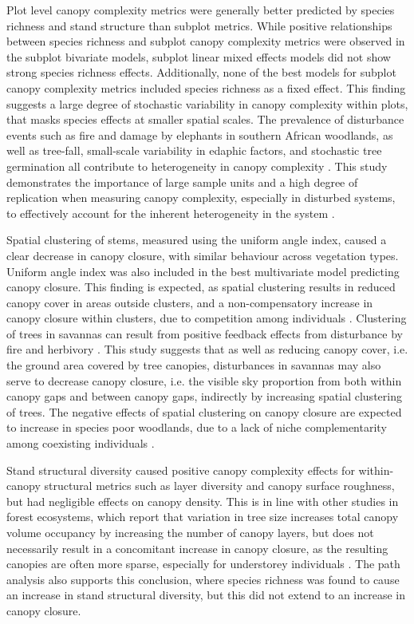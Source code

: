 \documentclass[11pt,a4paper]{article}
\begin{document}
Plot level canopy complexity metrics were generally better predicted by species richness and stand structure than subplot metrics. While positive relationships between species richness and subplot canopy complexity metrics were observed in the subplot bivariate models, subplot linear mixed effects models did not show strong species richness effects. Additionally, none of the best models for subplot canopy complexity metrics included species richness as a fixed effect. This finding suggests a large degree of stochastic variability in canopy complexity within plots, that masks species effects at smaller spatial scales. The prevalence of disturbance events such as fire and damage by elephants in southern African woodlands, as well as tree-fall, small-scale variability in edaphic factors, and stochastic tree germination all contribute to heterogeneity in canopy complexity \citep{}. This study demonstrates the importance of large sample units and a high degree of replication when measuring canopy complexity, especially in disturbed systems, to effectively account for the inherent heterogeneity in the system \citep{}.
 
Spatial clustering of stems, measured using the uniform angle index, caused a clear decrease in canopy closure, with similar behaviour across vegetation types. Uniform angle index was also included in the best multivariate model predicting canopy closure. This finding is expected, as spatial clustering results in reduced canopy cover in areas outside clusters, and a non-compensatory increase in canopy closure within clusters, due to competition among individuals \citep{}. Clustering of trees in savannas can result from positive feedback effects from disturbance by fire and herbivory \citep{}. This study suggests that as well as reducing canopy cover, i.e. the ground area covered by tree canopies, disturbances in savannas may also serve to decrease canopy closure, i.e. the visible sky proportion from both within canopy gaps and between canopy gaps, indirectly by increasing spatial clustering of trees. The negative effects of spatial clustering on canopy closure are expected to increase in species poor woodlands, due to a lack of niche complementarity among coexisting individuals \citep{}. 

Stand structural diversity caused positive canopy complexity effects for within-canopy structural metrics such as layer diversity and canopy surface roughness, but had negligible effects on canopy density. This is in line with other studies in forest ecosystems, which report that variation in tree size increases total canopy volume occupancy by increasing the number of canopy layers, but does not necessarily result in a concomitant increase in canopy closure, as the resulting canopies are often more sparse, especially for understorey individuals \citep{}. The path analysis also supports this conclusion, where species richness was found to cause an increase in stand structural diversity, but this did not extend to an increase in canopy closure. 
\end{document}
